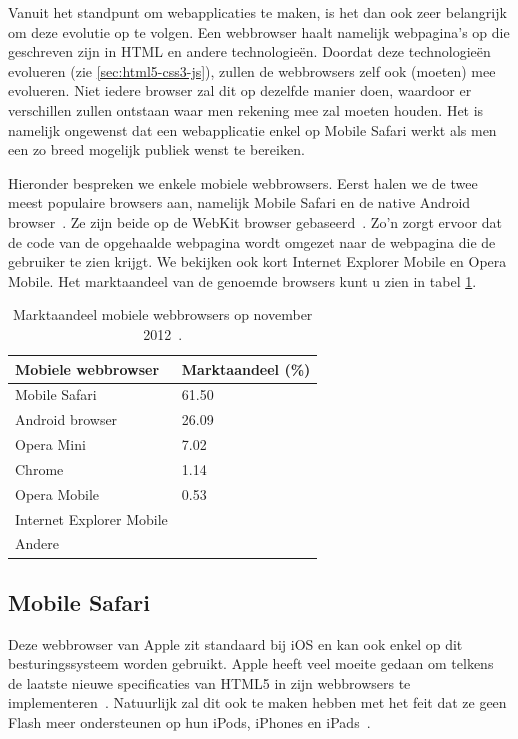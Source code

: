 Vanuit het standpunt om webapplicaties te maken, is het dan ook zeer belangrijk om deze evolutie op te volgen. 
Een webbrowser haalt namelijk webpagina's op die geschreven zijn in HTML en andere technologieën. 
Doordat deze technologieën evolueren (zie \ref{sec:html5-css3-js}), zullen de webbrowsers zelf ook (moeten) mee evolueren. 
Niet iedere browser zal dit op dezelfde manier doen, waardoor er verschillen zullen ontstaan waar men rekening mee zal moeten houden. 
Het is namelijk ongewenst dat een webapplicatie enkel op Mobile Safari werkt als men een zo breed mogelijk publiek wenst te bereiken. 

Hieronder bespreken we enkele mobiele webbrowsers. 
Eerst halen we de twee meest populaire browsers aan, namelijk Mobile Safari en de native Android browser~\cite{Hales2012}. 
Ze zijn beide op de WebKit browser  gebaseerd~\cite{Oeflman2011}. 
Zo'n  zorgt ervoor dat de code van de opgehaalde webpagina wordt omgezet naar de webpagina die de gebruiker te zien krijgt. 
We bekijken ook kort Internet Explorer Mobile en Opera Mobile. 
Het marktaandeel van de genoemde browsers kunt u zien in tabel \ref{tbl:marktaandeel-browsers}.

\begin{table}
\begin{center}
\begin{tabular}{ll}
\hline
\textbf{Mobiele webbrowser} & \textbf{Marktaandeel} (\%) \\
\hline
\hline
Mobile Safari				& 61.50 \\
Android browser				& 26.09 \\
Opera Mini				& 7.02 	\\
Chrome					& 1.14 	\\
Opera Mobile				& 0.53 	\\
Internet Explorer Mobile & 		\\
Andere					& 		\\
\hline
\end{tabular}
\caption{Marktaandeel mobiele webbrowsers op november 2012~\cite{NetApplications2012}.}
\label{tbl:marktaandeel-browsers}
\end{center}
\end{table}

\subsection{Mobile Safari}
\label{sec:mobile-safari}
Deze webbrowser van Apple zit standaard bij iOS en kan ook enkel op dit besturingssysteem worden gebruikt. 
Apple heeft veel moeite gedaan om telkens de laatste nieuwe specificaties van HTML5 in zijn webbrowsers te implementeren~\cite{Hales2012}. Natuurlijk zal dit ook te maken hebben met het feit dat ze geen Flash meer ondersteunen op hun iPods, iPhones en iPads~\cite{Jobs2010}.

